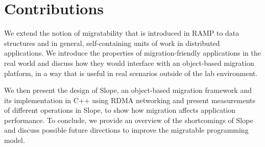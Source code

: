 % 
% 

\section{Contributions}
We extend the notion of migratability that is
introduced in RAMP \cite{memon2018ramp} to data structures and in general,
self-containing units of work in distributed applications.
We introduce
the properties of migration-friendly applications in the real world and discuss
how they would interface with an object-based migration platform, in a way
that is useful in real scenarios outside of the lab environment.

We then present the design of Slope, an object-based migration framework
and its implementation in C++ using RDMA networking and present measurements
of different operations in Slope, to show how migration affects application
performance.
To conclude, we provide an overview of the shortcomings of Slope and
discuss possible future directions to improve the migratable programming model.

